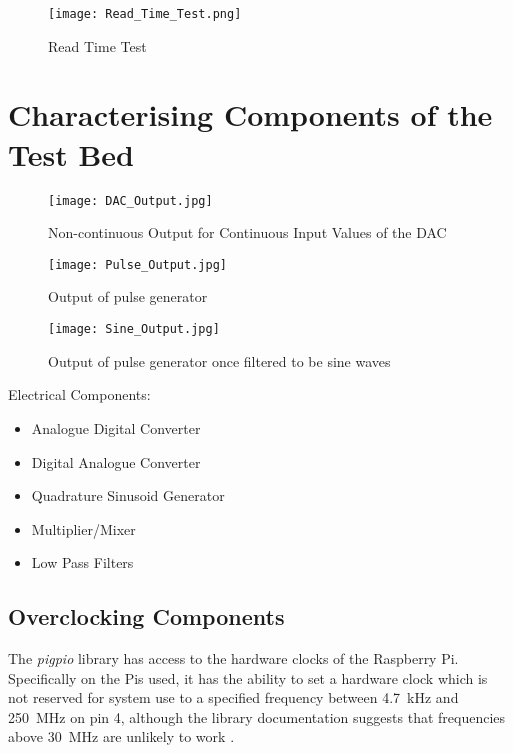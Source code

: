 \documentclass[../main.tex]{subfiles}
\begin{document}
\begin{figure}[ht]
	\centering
	\texttt{[image: Read\_Time\_Test.png]}
	\caption{Read Time Test}
\end{figure}

\clearpage


\section{Characterising Components of the Test Bed} \label{sec_Components}

\begin{figure}[ht]
	\centering
	\texttt{[image: DAC\_Output.jpg]}
	\caption{Non-continuous Output for Continuous Input Values of the DAC}
\end{figure}

\begin{figure}[ht]
	\centering
	\texttt{[image: Pulse\_Output.jpg]}
	\caption{Output of pulse generator}
\end{figure}

\begin{figure}[ht]
	\centering
	\texttt{[image: Sine\_Output.jpg]}
	\caption{Output of pulse generator once filtered to be sine waves}
\end{figure}



Electrical Components:
\begin{itemize}
	\item Analogue Digital Converter
	\item Digital Analogue Converter
	\item Quadrature Sinusoid Generator
	\item Multiplier/Mixer
	\item Low Pass Filters
\end{itemize}

\subsection{Overclocking Components} \label{sec_Overclocking}

The \textit{pigpio} library has access to the hardware clocks of the Raspberry Pi.
Specifically on the Pis used, it has the ability to set a hardware clock which is not reserved for system use to a specified frequency between \SI{4.7}{\kilo\hertz} and \SI{250}{\mega\hertz} on pin 4, although the library documentation suggests that frequencies above \SI{30}{\mega\hertz} are unlikely to work \cite{lib_pigpioHWClock}.\\
\end{document}
